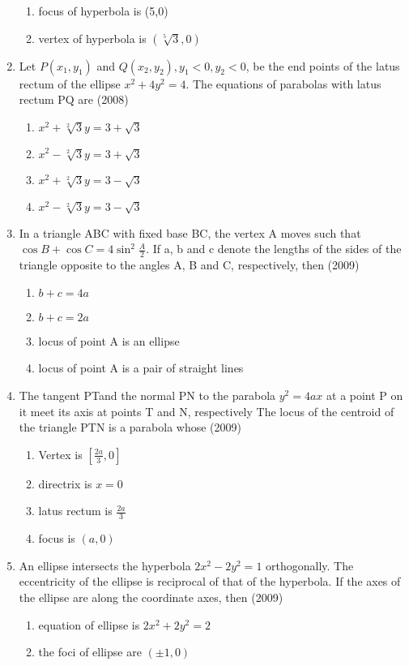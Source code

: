 \documentclass[12pt]{article}
\providecommand{\sbrak}[1]{\ensuremath{{}\left[#1\right]}}
\begin{document}
\begin{enumerate}
\begin{enumerate}
\item  focus of hyperbola is (5,0)
\item  vertex of hyperbola is $(\sqrt[5]{3},0)$
\end{enumerate}
\item Let $P(x_1,y_1)$ and $Q(x_2,y_2),y_1<0,y_2<0$, be the end points of the latus rectum of the ellipse $x^2+4y^2=4$. The equations of parabolas with latus rectum PQ are 
(2008)
\begin{enumerate}
\item $x^2+\sqrt[2]{3}y=3+\sqrt{3}$
\item $x^2-\sqrt[2]{3}y=3+\sqrt{3}$
\item $x^2+\sqrt[2]{3}y=3-\sqrt{3}$
\item $x^2-\sqrt[2]{3}y=3-\sqrt{3}$
\end{enumerate}
\item In a triangle ABC with fixed base BC, the vertex A moves such that $\cos B+\cos C=4\sin^2\frac{A}{2}$. If a, b and c denote the lengths of the sides of the triangle opposite to the angles A, B and C, respectively, then (2009)
\begin{enumerate}
\item $b+c=4a$
\item $b+c= 2a$
\item locus of point A is an ellipse
\item locus of point A is a pair of straight lines
\end{enumerate}
\item The tangent PTand the normal PN to the parabola $y^2=4ax$ at a point P on it meet its axis at points T and N, respectively The locus of the centroid of the triangle PTN is a parabola whose (2009)
\begin{enumerate}
\item Vertex is $\sbrak{\frac{2a}{3},0}$
\item directrix is $x=0$
\item latus rectum is $\frac{2a}{3}$
\item focus is $(a,0)$
\end{enumerate}
\item An ellipse intersects the hyperbola $2x^2-2y^2=1$ orthogonally. The eccentricity of the ellipse is reciprocal of that of the hyperbola. If the axes of the ellipse are along the coordinate axes, then (2009)
\begin{enumerate}
\item equation of ellipse is $2x^2+2y^2=2$
\item the foci of ellipse are $(\pm 1,0)$

\end{enumerate}
\end{enumerate}
\end{document}

